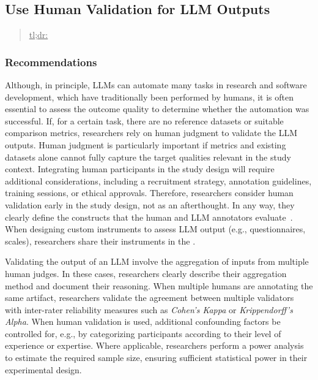 



\subsection{Use Human Validation for LLM Outputs}
\label{sec:use-human-validation-for-llm-outputs}

\begin{quote}
\underline{tl;dr:} 
\end{quote}

\subsubsection{Recommendations}

Although, in principle, LLMs can automate many tasks in research and software development, which have traditionally been performed by humans, it is often essential to assess the outcome quality to determine whether the automation was successful.
If, for a certain task, there are no reference datasets or suitable comparison metrics, researchers \should rely on human judgment to validate the LLM outputs.
Human judgment is particularly important if metrics and existing datasets alone cannot fully capture the target qualities relevant in the study context.
Integrating human participants in the study design will require additional considerations, including a recruitment strategy, annotation guidelines, training sessions, or ethical approvals.
Therefore, researchers \should consider human validation early in the study design, not as an afterthought.
In any way, they \must clearly define the constructs that the human and LLM annotators evaluate~\cite{DBLP:conf/ease/RalphT18}.
When designing custom instruments to assess LLM output (e.g., questionnaires, scales), researchers \should share their instruments in the \supplementarymaterial.

Validating the output of an LLM \may involve the aggregation of inputs from multiple human judges.
In these cases, researchers \should clearly describe their aggregation method and document their reasoning.
When multiple humans are annotating the same artifact, researchers \should validate the agreement between multiple validators with inter-rater reliability measures such as \emph{Cohen's Kappa} or \emph{Krippendorff's Alpha}.
When human validation is used, additional confounding factors \should be controlled for, e.g., by categorizing participants according to their level of experience or expertise.
Where applicable, researchers \should perform a power analysis to estimate the required sample size, ensuring sufficient statistical power in their experimental design.

